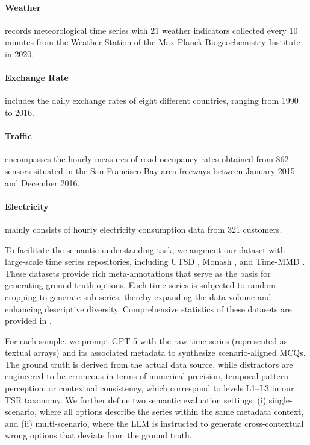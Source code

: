 \documentclass[11pt]{article}
\begin{document}
\paragraph{Weather} \cite{weatherd} records meteorological time series with 21 weather indicators collected every 10 minutes
from the Weather Station of the Max Planck Biogeochemistry Institute in 2020.

\paragraph{Exchange Rate} \cite{exchange} includes the daily exchange rates of eight different countries, ranging from 1990 to 2016.

\paragraph{Traffic} \cite{autoformer} encompasses the hourly measures of road occupancy rates obtained from 862 sensors situated in the San Francisco Bay area freeways between January 2015 and December 2016.

\paragraph{Electricity} \cite{autoformer} mainly consists of hourly electricity consumption data from 321 customers.

To facilitate the semantic understanding task, we augment our dataset with large-scale time series repositories, including UTSD \cite{timer}, Monash \cite{monash}, and Time-MMD \cite{timemmd}. These datasets provide rich meta-annotations that serve as the basis for generating ground-truth options. Each time series is subjected to random cropping to generate sub-series, thereby expanding the data volume and enhancing descriptive diversity. Comprehensive statistics of these datasets are provided in .

For each sample, we prompt GPT-5 with the raw time series (represented as textual arrays) and its associated metadata to synthesize scenario-aligned MCQs. The ground truth is derived from the actual data source, while distractors are engineered to be erroneous in terms of numerical precision, temporal pattern perception, or contextual consistency, which correspond to levels L1–L3 in our TSR taxonomy. We further define two semantic evaluation settings: (i) single-scenario, where all options describe the series within the same metadata context, and (ii) multi-scenario, where the LLM is instructed to generate cross-contextual wrong options that deviate from the ground truth.
\end{document}
